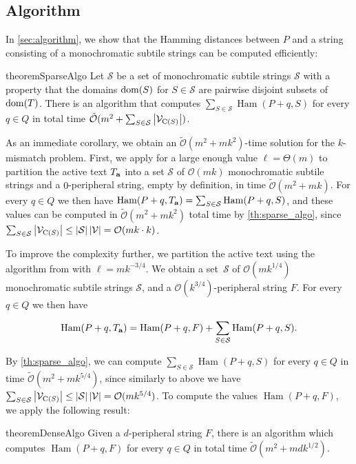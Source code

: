 \documentclass[11pt, letterpaper]{article}
\theoremstyle{plain}
\theoremstyle{definition}
\theoremstyle{remark}
\renewcommand{\O}{\mathcal{O}}
\newcommand{\tO}{\tilde{\mathcal{O}}}
\renewcommand{\S}{\mathcal{S}}
\newcommand{\V}{\mathcal{V}}
\DeclareMathOperator*{\Ham}{Ham}
\newcommand{\absolute}[1]{\left\lvert#1\right\rvert}
\begin{document}
\subsection{Algorithm}
In \cref{sec:algorithm}, we show that the Hamming distances between $P$ and a string consisting of a monochromatic subtile strings can be computed efficiently: 

\begin{restatable}{theorem}{SparseAlgo}
\label{th:sparse_algo}
Let $\S$ be a set of monochromatic subtile strings $\S$ with a property that the domains $\operatorname*{dom}(S)$ for $S \in \S$ are pairwise disjoint subsets of $\operatorname*{dom}(T)$. There is an algorithm that computes
$\sum_{S \in \S} \Ham(P + q, S)$ for every $q \in Q$ in total time $\tO(m^2 + \sum_{S \in \S} \absolute{\V_{\getchar{S}}})$.
\end{restatable}

As an immediate corollary, we obtain an $\tO(m^2 + mk^2)$-time solution for the $k$-mismatch problem. First, we apply  for a large enough value $\ell = \Theta(m)$ to partition the active text $T_\mathbf{a}$ into a set $\S$ of $\O(mk)$ monochromatic subtile strings and a $0$-peripheral string, empty by definition, in time $\tO(m^2 + mk)$. For every $q \in Q$ we then have $\Ham(P + q, \Ta) = \sum_{S \in \S} \Ham(P + q, S)$, and these values can be computed in $\tO(m^2 + mk^{2})$ total time by \cref{th:sparse_algo}, since $\sum_{S \in \S} \absolute{\V_{\getchar{S}}} \le \absolute{\S} \absolute{\V} = \O(mk \cdot k)$. 

To improve the complexity further, we partition the active text using the algorithm from  with $\ell = mk^{-3/4}$.
We obtain a set~$\S$ of $\O(mk^{1/4})$ monochromatic subtile strings $\S$, and a $\O(k^{3 / 4})$-peripheral string $F$. For every $q \in Q$ we then have

\[ \Ham(P + q, \Ta) = \Ham(P + q, F) + \sum_{S \in \S} \Ham(P + q, S).\]

By \cref{th:sparse_algo}, we can compute $\sum_{S \in \S} \Ham(P + q, S)$ for every $q \in Q$ in time $\tO(m^2 + mk^{5/4})$, since similarly to above we have $\sum_{S \in \S} \absolute{\V_{\getchar{S}}} \le \absolute{\S} \absolute{\V} = \O(mk^{5/4})$. To compute the values $\Ham(P + q, F)$, we apply the following result:

\begin{restatable*}{theorem}{DenseAlgo}
\label{th:dense_algo}
Given a $d$-peripheral string $F$, there is an algorithm which computes $\Ham(P + q, F)$ for every $q \in Q$ in total time $\tO(m^2 + mdk^{1/2})$.
\end{restatable*}
\end{document}
